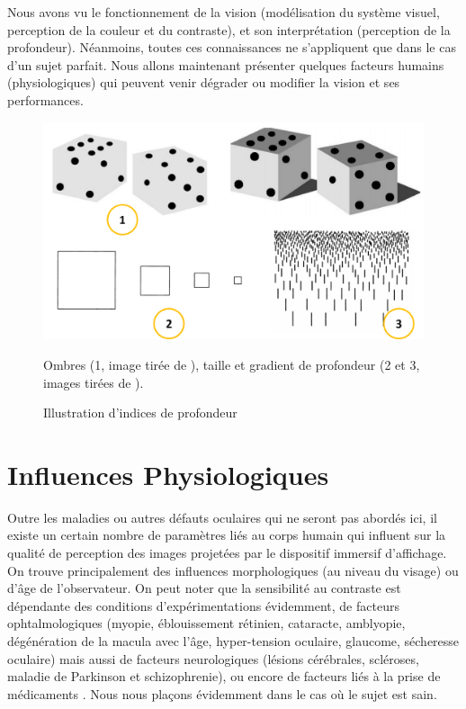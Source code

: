 	\par Nous avons vu le fonctionnement de la vision (modélisation du système visuel, perception de la couleur et du contraste), et son interprétation (perception de la profondeur). Néanmoins, toutes ces connaissances ne s'appliquent que dans le cas d'un sujet parfait. Nous allons maintenant présenter quelques facteurs humains (physiologiques) qui peuvent venir dégrader ou modifier la vision et ses performances.	
	
	\begin{figure}
		\centering
		\includegraphics[scale=.25]{Figures/PerspectivesProfondeur}
		\caption{Illustration d'indices de profondeur}{Ombres (1, image tirée de \citep{anses_effets_2014}), taille et gradient de profondeur (2 et 3, images tirées de \citep{glassner_principles_1995}).}
		\label{fig:profondeur_perspectives}
	\end{figure}
	
\chapter{Influences Physiologiques}
	\par Outre les maladies ou autres défauts oculaires qui ne seront pas abordés ici, il existe un certain nombre de paramètres liés au corps humain qui influent sur la qualité de perception des images projetées par le dispositif immersif d'affichage. On trouve principalement des influences morphologiques (au niveau du visage) ou d'âge de l'observateur. On peut noter que la sensibilité au contraste est dépendante des conditions d'expérimentations évidemment, de facteurs ophtalmologiques (myopie, éblouissement rétinien, cataracte, amblyopie, dégénération de la macula avec l'âge, hyper-tension oculaire, glaucome, sécheresse oculaire) mais aussi de facteurs neurologiques (lésions cérébrales, scléroses, maladie de Parkinson et schizophrenie), ou encore de facteurs liés à la prise de médicaments \citep{pelli_measuring_2013}. Nous nous plaçons évidemment dans le cas où le sujet est sain.
		
